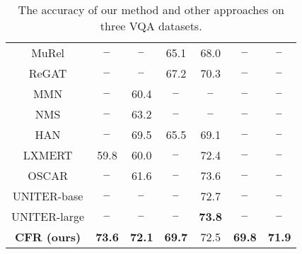\documentclass[10pt,twocolumn,letterpaper]{article}
\begin{document}
\begin{table}[!t]
\begin{center}
{\begin{tabular}{c|c|c|c|c|c|c}
MuRel \cite{cadene2019murel}       & $\--$                 & $\--$                    & 65.1                    & 68.0                       & $\--$                      & $\--$                      \\ 
ReGAT \cite{li2019regat}           & $\--$                 & $\--$                    & 67.2                    & 70.3                       & $\--$                      & $\--$                      \\  
MMN \cite{chen2021meta}            & $\--$                 & 60.4                     & $\--$                   & $\--$                      & $\--$                      & $\--$                      \\ 
NMS \cite{Hudson2019LearningBA}    & $\--$                 & 63.2                     & $\--$                   & $\--$                      & $\--$                      & $\--$                      \\ 
HAN \cite{kim2020hypergraph}       & $\--$                 & 69.5                     & 65.5                    & 69.1                       & $\--$                      & $\--$                      \\ \hline
LXMERT \cite{tan2019lxmert}        & 59.8                  & 60.0                     & $\--$                   & 72.4                       & $\--$                      & $\--$                      \\ 
OSCAR \cite{li2020oscar}           & $\--$                 & 61.6                     & $\--$                   & 73.6                       & $\--$                      & $\--$                      \\

UNITER-base \cite{chen2020uniter}           & $\--$                 & $\--$                    & $\--$                   & 72.7                      & $\--$                      & $\--$   \\

UNITER-large \cite{chen2020uniter}           & $\--$                 & $\--$                    & $\--$                   & \textbf{73.8}                      & $\--$                      & $\--$                      \\ \hline
\textbf{CFR (ours)}                                 & \textbf{73.6}         & \textbf{72.1}            & \textbf{69.7}           & 72.5              & \textbf{69.8}              & \textbf{71.9}              \\
\hline
\end{tabular}
}
\end{center}
\caption{The accuracy of our method and other approaches on three VQA datasets.
}
\label{tab:sota}
\end{table}
\end{document}
